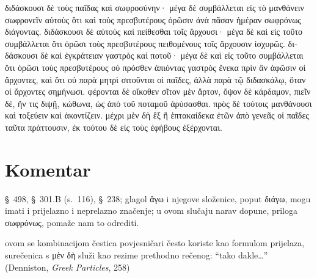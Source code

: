 
\medskip


{\large

\begin{greek}

\noindent  διδάσκουσι δὲ τοὺς παῖδας καὶ σωφροσύνην· μέγα δὲ συμβάλλεται εἰς τὸ μανθάνειν σωφρονεῖν αὐτοὺς ὅτι καὶ τοὺς πρεσβυτέρους ὁρῶσιν ἀνὰ πᾶσαν ἡμέραν σωφρόνως διάγοντας. διδάσκουσι δὲ αὐτοὺς καὶ πείθεσθαι τοῖς ἄρχουσι· μέγα δὲ καὶ εἰς τοῦτο συμβάλλεται ὅτι ὁρῶσι τοὺς πρεσβυτέρους πειθομένους τοῖς ἄρχουσιν ἰσχυρῶς. διδάσκουσι δὲ καὶ ἐγκράτειαν γαστρὸς καὶ ποτοῦ· μέγα δὲ καὶ εἰς τοῦτο συμβάλλεται ὅτι ὁρῶσι τοὺς πρεσβυτέρους οὐ πρόσθεν ἀπιόντας γαστρὸς ἕνεκα πρὶν ἂν ἀφῶσιν οἱ ἄρχοντες, καὶ ὅτι οὐ παρὰ μητρὶ σιτοῦνται οἱ παῖδες, ἀλλὰ παρὰ τῷ διδασκάλῳ, ὅταν οἱ ἄρχοντες σημήνωσι. φέρονται δὲ οἴκοθεν σῖτον μὲν ἄρτον, ὄψον δὲ κάρδαμον, πιεῖν δέ, ἤν τις διψῇ, κώθωνα, ὡς ἀπὸ τοῦ ποταμοῦ ἀρύσασθαι. πρὸς δὲ τούτοις μανθάνουσι καὶ τοξεύειν καὶ ἀκοντίζειν. μέχρι μὲν δὴ ἓξ ἢ ἑπτακαίδεκα ἐτῶν ἀπὸ γενεᾶς οἱ παῖδες ταῦτα πράττουσιν, ἐκ τούτου δὲ εἰς τοὺς ἐφήβους ἐξέρχονται.

\end{greek}

}


\section*{Komentar}



\begin{description}[noitemsep]
\item[διάγοντας] §~498, §~301.B (s.~116), §~238; glagol ἄγω i njegove složenice, poput διάγω, mogu imati i prijelazno i neprelazno značenje; u ovom slučaju narav dopune, priloga σωφρόνως, pomaže nam to odrediti.
\end{description}








\begin{description}[noitemsep]
\item[μὲν δὴ] ovom se kombinacijom čestica povjesničari često koriste kao formulom prijelaza, surečenica s μὲν δὴ služi kao rezime prethodno rečenog: ``tako dakle\dots'' (Denniston, \textit{Greek Particles}, 258)%
\end{description}


